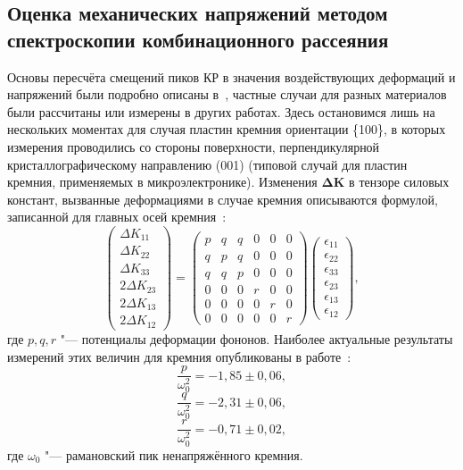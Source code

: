 \subsection{Оценка механических напряжений методом спектроскопии комбинационного рассеяния}
Основы пересчёта смещений пиков КР в значения воздействующих деформаций и
напряжений были подробно описаны в~\cite{Ganesan1970}, частные случаи для разных
материалов были рассчитаны или измерены в других работах.
Здесь остановимся лишь на нескольких моментах для случая пластин кремния
ориентации \{100\}, в которых измерения проводились со стороны поверхности,
перпендикулярной кристаллографическому направлению (001) (типовой случай для
пластин кремния, применяемых в микроэлектронике).
Изменения \(\mathbf{\Delta K}\) в тензоре силовых констант, вызванные
деформациями в случае кремния описываются формулой, записанной для главных осей
кремния~\cite{Narayanan1997}:
\begin{equation}
    \begin{pmatrix}
    \Delta K_{11}\\
    \Delta K_{22}\\
    \Delta K_{33}\\
    2\Delta K_{23}\\
    2\Delta K_{13}\\
    2\Delta K_{12}
    \end{pmatrix}
    =
    \begin{pmatrix}
    p & q & q & 0 & 0 & 0 \\
    q & p & q & 0 & 0 & 0 \\
    q & q & p & 0 & 0 & 0 \\
    0 & 0 & 0 & r & 0 & 0 \\
    0 & 0 & 0 & 0 & r & 0 \\
    0 & 0 & 0 & 0 & 0 & r
    \end{pmatrix}
    \begin{pmatrix}
    \epsilon_{11}\\
    \epsilon_{22}\\
    \epsilon_{33}\\
    \epsilon_{23}\\
    \epsilon_{13}\\
    \epsilon_{12}
    \end{pmatrix}\!\!,
\end{equation}
где \(p, q, r\) "--- потенциалы деформации фононов. Наиболее актуальные
результаты измерений этих величин для кремния опубликованы в
работе~\cite{Anastassakis1990}:%
\[ \frac{p}{\omega_0^2} = -1,85 \pm 0,06, \]%
\[ \frac{q}{\omega_0^2} = -2,31 \pm 0,06, \]%
\[ \frac{r}{\omega_0^2} = -0,71 \pm 0,02, \]%
где \(\omega_0\) "--- рамановский пик ненапряжённого кремния.

